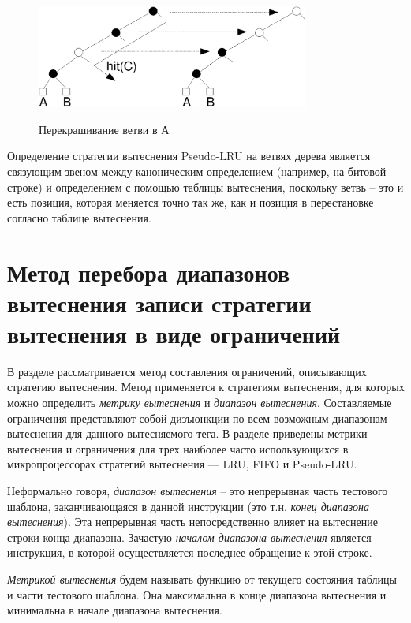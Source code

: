 \documentclass[14pt]{extreport}
\newcommand{\LRU}{\textsf{LRU}\xspace}
\newcommand{\FIFO}{\textsf{FIFO}\xspace}
\newcommand{\PseudoLRU}{\textsf{Pseudo-LRU}\xspace}
\begin{document}
\begin{figure}[h] \center
  \includegraphics[width=0.8\textwidth]{1.review/recolor}\\
  \caption{Перекрашивание ветви в А}\label{recolor}
\end{figure}


Определение стратегии вытеснения \PseudoLRU на ветвях дерева
является связующим звеном между каноническим определением (например,
на битовой строке) и определением с помощью таблицы вытеснения,
поскольку ветвь -- это и есть позиция, которая меняется точно так
же, как и позиция в перестановке согласно таблице вытеснения.

\section{Метод перебора диапазонов вытеснения записи стратегии
вытеснения в виде ограничений}

{\footnotesize В разделе рассматривается метод составления ограничений,
описывающих
стратегию вытеснения. Метод применяется к стратегиям вытеснения, для
которых можно определить \emph{метрику вытеснения} и \emph{диапазон
вытеснения}. Составляемые ограничения представляют собой дизъюнкции
по всем возможным диапазонам вытеснения для данного вытесняемого
тега. В разделе приведены метрики вытеснения и ограничения для трех
наиболее часто использующихся в микропроцессорах стратегий
вытеснения --- \LRU, \FIFO и \PseudoLRU}.

Неформально говоря, \emph{диапазон вытеснения} -- это непрерывная
часть тестового шаблона, заканчивающаяся в данной инструкции (это
т.н. \emph{конец диапазона вытеснения}). Эта непрерывная часть непосредственно
влияет на вытеснение строки конца диапазона.
Зачастую \emph{началом диапазона вытеснения} является инструкция, в
которой осуществляется последнее обращение к этой строке.

\emph{Метрикой вытеснения} будем называть функцию от текущего
состояния таблицы и части тестового шаблона. Она
максимальна в конце диапазона вытеснения и минимальна в начале
диапазона вытеснения.
\end{document}
